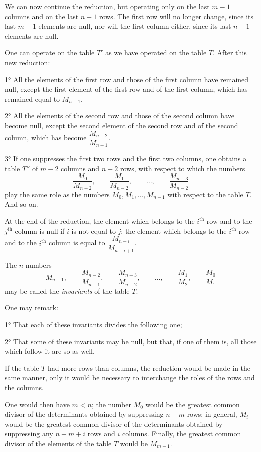 \documentclass{article}
\begin{document}
We can now continue the reduction, but operating only on the last $m-1$ columns and on the last $n-1$ rows. The first row will no longer change, since its last $m-1$ elements are null, nor will the first column either, since its last $n-1$ elements are null.

One can operate on the table $T'$ as we have operated on the table $T$. After this new reduction:

1° All the elements of the first row and those of the first column have remained null, except the first element of the first row and of the first column, which has remained equal to $M_{n-1}$.

2° All the elements of the second row and those of the second column have become null, except the second element of the second row and of the second column, which has become $\dfrac{M_{n-2}}{M_{n-1}}$.

3° If one suppresses the first two rows and the first two columns, one obtains a table $T''$ of $m-2$ columns and $n-2$ rows, with respect to which the numbers
\[ \frac{M_{0}}{M_{n-2}}, \qquad \frac{M_{1}}{M_{n-2}}, \qquad \ldots, \qquad \frac{M_{n-3}}{M_{n-2}} \]
play the same role as the numbers $M_{0}, M_{1}, \ldots, M_{n-1}$ with respect to the table $T$. And so on.

At the end of the reduction, the element which belongs to the $i^{\text{th}}$ row and to the $j^{\text{th}}$ column is null if $i$ is not equal to $j$; the element which belongs to the $i^{\text{th}}$ row and to the $i^{\text{th}}$ column is equal to $\dfrac{M_{n-i}}{M_{n-i+1}}$.

The $n$ numbers
\[ M_{n-1}, \qquad \frac{M_{n-2}}{M_{n-1}}, \qquad \frac{M_{n-3}}{M_{n-2}}, \qquad \ldots, \qquad \frac{M_{1}}{M_{2}}, \qquad \frac{M_{0}}{M_{1}} \tag{3} \]
may be called the \emph{invariants} of the table $T$.

One may remark:

1° That each of these invariants divides the following one;

2° That some of these invariants may be null, but that, if one of them is, all those which follow it are so as well.

If the table $T$ had more rows than columns, the reduction would be made in the same manner, only it would be necessary to interchange the roles of the rows and the columns.

One would then have $m<n$; the number $M_{0}$ would be the greatest common divisor of the determinants obtained by suppressing $n-m$ rows; in general, $M_{i}$ would be the greatest common divisor of the determinants obtained by suppressing any $n-m+i$ rows and $i$ columns. Finally, the greatest common divisor of the elements of the table $T$ would be $M_{m-1}$.
\end{document}
